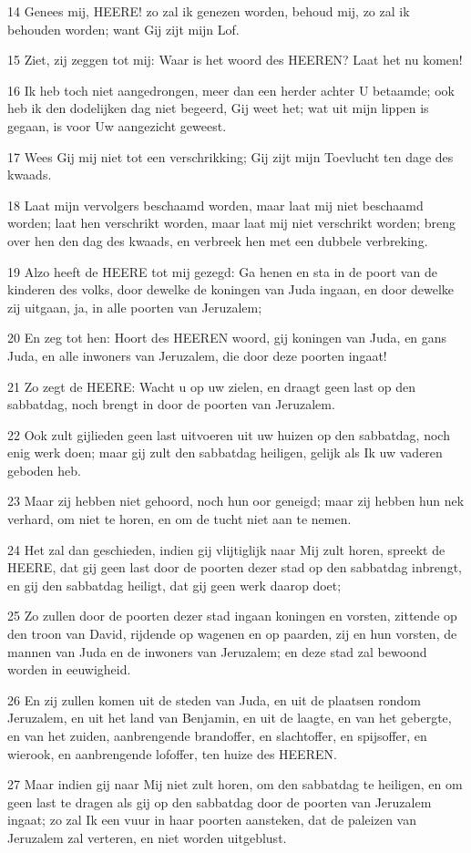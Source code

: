 \par 14 Genees mij, HEERE! zo zal ik genezen worden, behoud mij, zo zal ik behouden worden; want Gij zijt mijn Lof.
\par 15 Ziet, zij zeggen tot mij: Waar is het woord des HEEREN? Laat het nu komen!
\par 16 Ik heb toch niet aangedrongen, meer dan een herder achter U betaamde; ook heb ik den dodelijken dag niet begeerd, Gij weet het; wat uit mijn lippen is gegaan, is voor Uw aangezicht geweest.
\par 17 Wees Gij mij niet tot een verschrikking; Gij zijt mijn Toevlucht ten dage des kwaads.
\par 18 Laat mijn vervolgers beschaamd worden, maar laat mij niet beschaamd worden; laat hen verschrikt worden, maar laat mij niet verschrikt worden; breng over hen den dag des kwaads, en verbreek hen met een dubbele verbreking.
\par 19 Alzo heeft de HEERE tot mij gezegd: Ga henen en sta in de poort van de kinderen des volks, door dewelke de koningen van Juda ingaan, en door dewelke zij uitgaan, ja, in alle poorten van Jeruzalem;
\par 20 En zeg tot hen: Hoort des HEEREN woord, gij koningen van Juda, en gans Juda, en alle inwoners van Jeruzalem, die door deze poorten ingaat!
\par 21 Zo zegt de HEERE: Wacht u op uw zielen, en draagt geen last op den sabbatdag, noch brengt in door de poorten van Jeruzalem.
\par 22 Ook zult gijlieden geen last uitvoeren uit uw huizen op den sabbatdag, noch enig werk doen; maar gij zult den sabbatdag heiligen, gelijk als Ik uw vaderen geboden heb.
\par 23 Maar zij hebben niet gehoord, noch hun oor geneigd; maar zij hebben hun nek verhard, om niet te horen, en om de tucht niet aan te nemen.
\par 24 Het zal dan geschieden, indien gij vlijtiglijk naar Mij zult horen, spreekt de HEERE, dat gij geen last door de poorten dezer stad op den sabbatdag inbrengt, en gij den sabbatdag heiligt, dat gij geen werk daarop doet;
\par 25 Zo zullen door de poorten dezer stad ingaan koningen en vorsten, zittende op den troon van David, rijdende op wagenen en op paarden, zij en hun vorsten, de mannen van Juda en de inwoners van Jeruzalem; en deze stad zal bewoond worden in eeuwigheid.
\par 26 En zij zullen komen uit de steden van Juda, en uit de plaatsen rondom Jeruzalem, en uit het land van Benjamin, en uit de laagte, en van het gebergte, en van het zuiden, aanbrengende brandoffer, en slachtoffer, en spijsoffer, en wierook, en aanbrengende lofoffer, ten huize des HEEREN.
\par 27 Maar indien gij naar Mij niet zult horen, om den sabbatdag te heiligen, en om geen last te dragen als gij op den sabbatdag door de poorten van Jeruzalem ingaat; zo zal Ik een vuur in haar poorten aansteken, dat de paleizen van Jeruzalem zal verteren, en niet worden uitgeblust.

